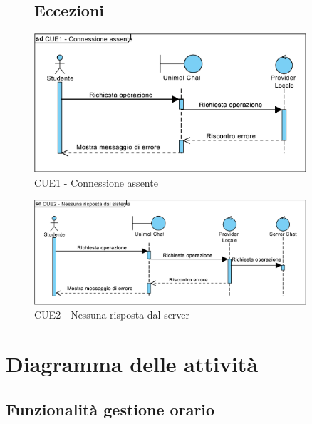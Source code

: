 \begin{figure}
	\subsection{Eccezioni}
	\centering
	\includegraphics[width=0.9\textwidth]{imgs/gruppo6/sequence/CUE1_connessione_assente.pdf}
	\caption{CUE1 - Connessione assente}
	\label{fig:seq-cue1}
\end{figure}


\begin{figure}
	\centering
	\includegraphics[width=0.9\textwidth]{imgs/gruppo6/sequence/CUE2_nessuna_risposta_dal_server.pdf}
	\caption{CUE2 - Nessuna risposta dal server}
	\label{fig:seq-cue2}
\end{figure}

\section{Diagramma delle attività}

\subsection{Funzionalità gestione orario}
